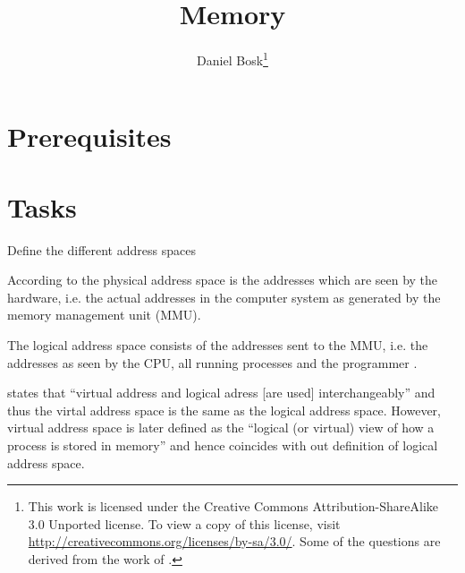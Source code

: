 \documentclass[a4paper]{miunasgn}
\title{Memory}
\author{Daniel Bosk\footnote{%
	This work is licensed under the Creative Commons Attribution-ShareAlike 3.0 
	Unported license.
	To view a copy of this license, visit 
	\url{http://creativecommons.org/licenses/by-sa/3.0/}.
	Some of the questions are derived from the work of 
	\citeauthor*{Silberschatz2009osc}.
}}
\date{\svnId}
\theoremstyle{definition}
\begin{document}
\maketitle
\thispagestyle{foot}
\tableofcontents


\section{Prerequisites}
\label{sec:Prerequisites}
\noindent



\section{Tasks}
\label{sec:Tasks}
\noindent
\begin{questions}


	\question\label{q:addressspaces}
	Define the different address spaces
	\begin{solution}
		According to \citet[p. 319]{Silberschatz2009osc} the physical address space 
		is the addresses which are seen by the hardware, i.e. the actual addresses 
		in the computer system as generated by the memory management unit (MMU).

		The logical address space consists of the addresses sent to the MMU, i.e.  
		the addresses as seen by the CPU, all running processes and the programmer 
		\citep[ch. 8]{Silberschatz2009osc}.

		\citet{Silberschatz2009osc} states that ``virtual address and logical 
		adress [are used] interchangeably'' \citep[p. 319]{Silberschatz2009osc} and 
		thus the virtal address space is the same as the logical address space.
		However, virtual address space is later defined as the ``logical (or 
		virtual) view of how a process is stored in memory'' \citep[p.  
		359]{Silberschatz2009osc} and hence coincides with out definition of 
		logical address space.
	\end{solution}


\end{questions}
\end{document}
